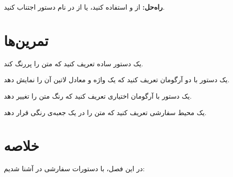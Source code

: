 \textbf{راه‌حل:} از  و
 استفاده کنید، یا از
 در نام دستور اجتناب کنید.


\section{تمرین‌ها}
\label{sec:custom-commands-exercises}

\begin{exercise}
    یک دستور ساده تعریف کنید که متن را
    پررنگ کند.
    \label{exc:custom-commands-bold}
\end{exercise}

\begin{exercise}
    یک دستور با دو آرگومان تعریف کنید
    که یک واژه و معادل لاتین آن را نمایش
    دهد.
    \label{exc:custom-commands-two-args}
\end{exercise}

\begin{exercise}
    یک دستور با آرگومان اختیاری تعریف کنید
    که رنگ متن را تغییر دهد.
    \label{exc:custom-commands-optional}
\end{exercise}

\begin{exercise}
    یک محیط سفارشی تعریف کنید که متن را
    در یک جعبه‌ی رنگی قرار دهد.
    \label{exc:custom-commands-env}
\end{exercise}

\section{خلاصه}
\label{sec:custom-commands-summary}

در این فصل، با دستورات سفارشی در 
آشنا شدیم:

